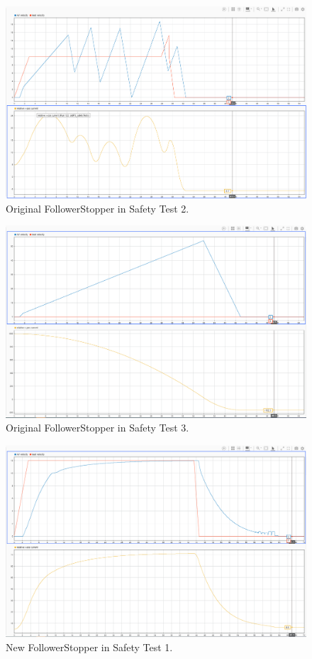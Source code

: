 \documentclass[conference]{IEEEtran}
\begin{document}
\begin{appendix}
\begin{figure}[htbp]
\centerline{\includegraphics[width=5.71 in]{oldFS_safety2.PNG}}
\caption{Original FollowerStopper in Safety Test 2.}
\label{oldsafe2}
\end{figure}

\begin{figure}[htbp]
\centerline{\includegraphics[width=5.71 in]{oldFS_safety3.PNG}}
\caption{Original FollowerStopper in Safety Test 3.}
\label{oldsafe3}
\end{figure}

\begin{figure}[htbp]
\centerline{\includegraphics[width=5.71 in]{newFS_safety1.PNG}}
\caption{New FollowerStopper in Safety Test 1.}
\label{newsafe1}
\end{figure}


\end{appendix}
\end{document}
